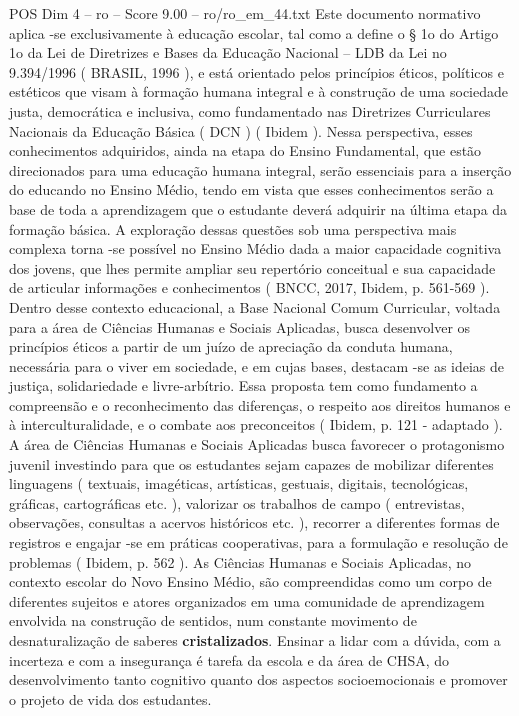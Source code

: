\begin{textsample}{POS Dim 4 – ro – Score 9.00 – ro/ro\_em\_44.txt}
Este documento normativo aplica -se exclusivamente à educação escolar, tal como a define o § 1o do Artigo 1o da Lei de Diretrizes e Bases da Educação Nacional – LDB da Lei no 9.394/1996 ( BRASIL, 1996 ), e está orientado pelos princípios éticos, políticos e estéticos que visam à formação humana integral e à construção de uma sociedade justa, democrática e inclusiva, como fundamentado nas Diretrizes Curriculares Nacionais da Educação Básica ( DCN ) ( Ibidem ).
Nessa perspectiva, esses conhecimentos adquiridos, ainda na etapa do Ensino Fundamental, que estão direcionados para uma educação humana integral, serão essenciais para a inserção do educando no Ensino Médio, tendo em vista que esses conhecimentos serão a base de toda a aprendizagem que o estudante deverá adquirir na última etapa da formação básica.
A exploração dessas questões sob uma perspectiva mais complexa torna -se possível no Ensino Médio dada a maior capacidade cognitiva dos jovens, que lhes permite ampliar seu repertório conceitual e sua capacidade de articular informações e conhecimentos ( BNCC, 2017, Ibidem, p. 561-569 ).
Dentro desse contexto educacional, a Base Nacional Comum Curricular, voltada para a área de Ciências Humanas e Sociais Aplicadas, busca desenvolver os princípios éticos a partir de um juízo de apreciação da conduta humana, necessária para o viver em sociedade, e em cujas bases, destacam -se as ideias de justiça, solidariedade e livre-arbítrio.
Essa proposta tem como fundamento a compreensão e o reconhecimento das diferenças, o respeito aos direitos humanos e à interculturalidade, e o combate aos preconceitos ( Ibidem, p. 121 - adaptado ).
A área de Ciências Humanas e Sociais Aplicadas busca favorecer o protagonismo juvenil investindo para que os estudantes sejam capazes de mobilizar diferentes linguagens ( textuais, imagéticas, artísticas, gestuais, digitais, tecnológicas, gráficas, cartográficas etc. ), valorizar os trabalhos de campo ( entrevistas, observações, consultas a acervos históricos etc. ), recorrer a diferentes formas de registros e engajar -se em práticas cooperativas, para a formulação e resolução de problemas ( Ibidem, p. 562 ).
As Ciências Humanas e Sociais Aplicadas, no contexto escolar do Novo Ensino Médio, são compreendidas como um corpo de diferentes sujeitos e atores organizados em uma comunidade de aprendizagem envolvida na construção de sentidos, num constante movimento de desnaturalização de saberes \textbf{cristalizados}.
Ensinar a lidar com a dúvida, com a incerteza e com a insegurança é tarefa da escola e da área de CHSA, do desenvolvimento tanto cognitivo quanto dos aspectos socioemocionais e promover o projeto de vida dos estudantes.

\end{textsample}

